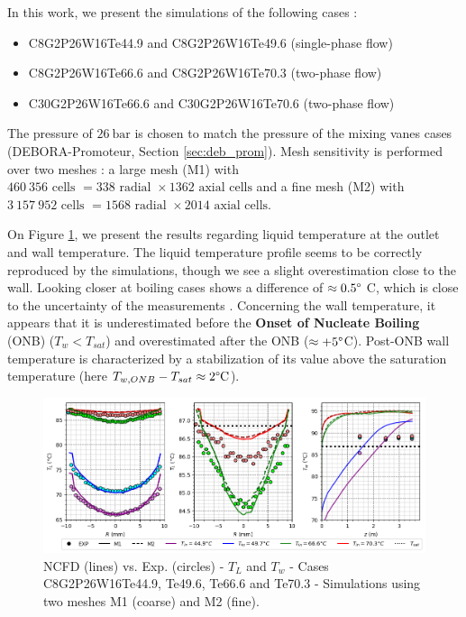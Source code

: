 In this work, we present the simulations of the following cases :
\begin{itemize}
\item C8G2P26W16Te44.9 and C8G2P26W16Te49.6 (single-phase flow)
\item C8G2P26W16Te66.6 and C8G2P26W16Te70.3 (two-phase flow)
\item C30G2P26W16Te66.6 and C30G2P26W16Te70.6 (two-phase flow)
\end{itemize}

The pressure of $26~\text{bar}$ is chosen to match the pressure of the mixing vanes cases (DEBORA-Promoteur, Section \ref{sec:deb_prom}). Mesh sensitivity is performed over two meshes : a large mesh (M1) with $460~356\text{ cells }=338\text{ radial } \times 1362 \text{ axial cells}$ and a fine mesh (M2) with $3~157~952\text{ cells }=1568\text{ radial } \times 2014 \text{ axial cells}$.

On Figure \ref{fig:th_1phi_res}, we present the results regarding liquid temperature at the outlet and wall temperature. The liquid temperature profile seems to be correctly reproduced by the simulations, though we see a slight overestimation close to the wall. Looking closer at boiling cases shows a difference of $\approx 0.5\degree$ C, which is close to the uncertainty of the measurements \cite{Garnier2001}. Concerning the wall temperature, it appears that it is underestimated before the \textbf{Onset of Nucleate Boiling} (ONB) ($T_{w}<T_{sat}$) and overestimated after the ONB ($\approx +5\degree$C). Post-ONB wall temperature is characterized by a stabilization of its value above the saturation temperature (here $T_{w,ONB}-T_{sat}\approx 2\degree\text{C}$).

%
\begin{figure}[h!]
\centering
\includegraphics[scale=0.60]{img/DEBORA/c8.png}
\caption{NCFD (lines) vs. Exp. (circles) - $T_{L}$ and $T_{w}$ - Cases C8G2P26W16Te44.9, Te49.6, Te66.6 and Te70.3 - Simulations using two meshes M1 (coarse) and M2 (fine).}
\label{fig:th_1phi_res}
\end{figure}
%

